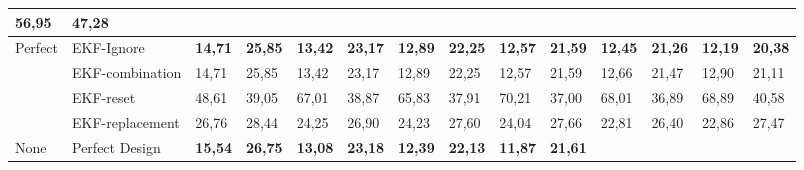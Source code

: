 \documentclass[letterpaper, 10 pt, conference]{ieeeconf}  %
\begin{document}
\begin{table*}[]
\begin{tabular}{@{}llllllllllllll@{}}
		\multicolumn{1}{l|}{56,95} &
		\multicolumn{1}{l|}{47,28} \\ \midrule
		\multicolumn{1}{|l|}{\multirow{4}{*}{Perfect}} &
		\multicolumn{1}{l|}{EKF-Ignore} &
		\multicolumn{1}{c|}{\textbf{14,71}} &
		\multicolumn{1}{c|}{\textbf{25,85}} &
		\multicolumn{1}{c|}{\textbf{13,42}} &
		\multicolumn{1}{c|}{\textbf{23,17}} &
		\multicolumn{1}{c|}{\textbf{12,89}} &
		\multicolumn{1}{c|}{\textbf{22,25}} &
		\multicolumn{1}{c|}{\textbf{12,57}} &
		\multicolumn{1}{c|}{\textbf{21,59}} &
		\multicolumn{1}{c|}{\textbf{12,45}} &
		\multicolumn{1}{c|}{\textbf{21,26}} &
		\multicolumn{1}{c|}{\textbf{12,19}} &
		\multicolumn{1}{c|}{\textbf{20,38}} \\ \cmidrule(l){2-14} 
		\multicolumn{1}{|l|}{} &
		\multicolumn{1}{l|}{EKF-combination} &
		\multicolumn{1}{l|}{14,71} &
		\multicolumn{1}{l|}{25,85} &
		\multicolumn{1}{l|}{13,42} &
		\multicolumn{1}{l|}{23,17} &
		\multicolumn{1}{l|}{12,89} &
		\multicolumn{1}{l|}{22,25} &
		\multicolumn{1}{l|}{12,57} &
		\multicolumn{1}{l|}{21,59} &
		\multicolumn{1}{l|}{12,66} &
		\multicolumn{1}{l|}{21,47} &
		\multicolumn{1}{l|}{12,90} &
		\multicolumn{1}{l|}{21,11} \\ \cmidrule(l){2-14} 
		\multicolumn{1}{|l|}{} &
		\multicolumn{1}{l|}{EKF-reset} &
		\multicolumn{1}{l|}{48,61} &
		\multicolumn{1}{l|}{39,05} &
		\multicolumn{1}{l|}{67,01} &
		\multicolumn{1}{l|}{38,87} &
		\multicolumn{1}{l|}{65,83} &
		\multicolumn{1}{l|}{37,91} &
		\multicolumn{1}{l|}{70,21} &
		\multicolumn{1}{l|}{37,00} &
		\multicolumn{1}{l|}{68,01} &
		\multicolumn{1}{l|}{36,89} &
		\multicolumn{1}{l|}{68,89} &
		\multicolumn{1}{l|}{40,58} \\ \cmidrule(l){2-14} 
		\multicolumn{1}{|l|}{} &
		\multicolumn{1}{l|}{EKF-replacement} &
		\multicolumn{1}{l|}{26,76} &
		\multicolumn{1}{l|}{28,44} &
		\multicolumn{1}{l|}{24,25} &
		\multicolumn{1}{l|}{26,90} &
		\multicolumn{1}{l|}{24,23} &
		\multicolumn{1}{l|}{27,60} &
		\multicolumn{1}{l|}{24,04} &
		\multicolumn{1}{l|}{27,66} &
		\multicolumn{1}{l|}{22,81} &
		\multicolumn{1}{l|}{26,40} &
		\multicolumn{1}{l|}{22,86} &
		\multicolumn{1}{l|}{27,47} \\ \midrule
		\multicolumn{1}{|l|}{\multirow{2}{*}{None}} &
		\multicolumn{1}{l|}{Perfect Design} &
		\multicolumn{1}{c|}{\textbf{15,54}} &
		\multicolumn{1}{c|}{\textbf{26,75}} &
		\multicolumn{1}{c|}{\textbf{13,08}} &
		\multicolumn{1}{c|}{\textbf{23,18}} &
		\multicolumn{1}{c|}{\textbf{12,39}} &
		\multicolumn{1}{c|}{\textbf{22,13}} &
		\multicolumn{1}{c|}{\textbf{11,87}} &
		\multicolumn{1}{c|}{\textbf{21,61}} &

\end{tabular}
\end{table*}
\end{document}
